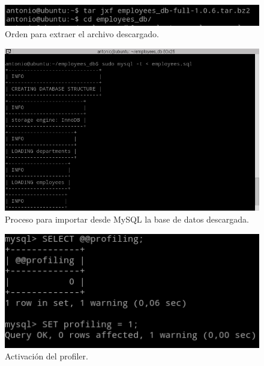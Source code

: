 \begin{figure}[H]
  \begin{center}
    \includegraphics[width=1\textwidth]{imagenes/extraccion}
    \caption{Orden para extraer el archivo descargado.}
    \label{fig23}
  \end{center}
\end{figure}

\begin{figure}[H]
  \begin{center}
    \includegraphics[width=1\textwidth]{imagenes/importacion}
    \caption{Proceso para importar desde MySQL la base de datos descargada.}
    \label{fig24}
  \end{center}
\end{figure}

\begin{figure}[H]
  \begin{center}
    \includegraphics[width=1\textwidth]{imagenes/prof}
    \caption{Activación del profiler.}
    \label{fig25}
  \end{center}
\end{figure}

